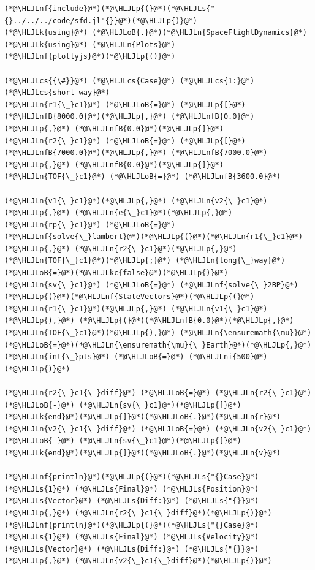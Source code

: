 \documentclass[12pt,a4paper]{article}
\newcommand{\HLJLk}[1]{\textcolor[RGB]{148,91,176}{\textbf{#1}}}
\newcommand{\HLJLkc}[1]{\textcolor[RGB]{59,151,46}{\textit{#1}}}
\newcommand{\HLJLn}[1]{#1}
\newcommand{\HLJLnf}[1]{\textcolor[RGB]{66,102,213}{#1}}
\newcommand{\HLJLs}[1]{\textcolor[RGB]{201,61,57}{#1}}
\newcommand{\HLJLnfB}[1]{\textcolor[RGB]{59,151,46}{#1}}
\newcommand{\HLJLni}[1]{\textcolor[RGB]{59,151,46}{#1}}
\newcommand{\HLJLoB}[1]{\textcolor[RGB]{102,102,102}{\textbf{#1}}}
\newcommand{\HLJLp}[1]{#1}
\newcommand{\HLJLcs}[1]{\textcolor[RGB]{153,153,119}{\textit{#1}}}
\begin{document}
\begin{lstlisting}
(*@\HLJLnf{include}@*)(*@\HLJLp{(}@*)(*@\HLJLs{"{}../../../code/sfd.jl"{}}@*)(*@\HLJLp{)}@*)
(*@\HLJLk{using}@*) (*@\HLJLoB{.}@*)(*@\HLJLn{SpaceFlightDynamics}@*)
(*@\HLJLk{using}@*) (*@\HLJLn{Plots}@*)
(*@\HLJLnf{plotlyjs}@*)(*@\HLJLp{()}@*)

(*@\HLJLcs{{\#}}@*) (*@\HLJLcs{Case}@*) (*@\HLJLcs{1:}@*) (*@\HLJLcs{short‐way}@*)
(*@\HLJLn{r1{\_}c1}@*) (*@\HLJLoB{=}@*) (*@\HLJLp{[}@*)(*@\HLJLnfB{8000.0}@*)(*@\HLJLp{,}@*) (*@\HLJLnfB{0.0}@*)(*@\HLJLp{,}@*) (*@\HLJLnfB{0.0}@*)(*@\HLJLp{]}@*)
(*@\HLJLn{r2{\_}c1}@*) (*@\HLJLoB{=}@*) (*@\HLJLp{[}@*)(*@\HLJLnfB{7000.0}@*)(*@\HLJLp{,}@*) (*@\HLJLnfB{7000.0}@*)(*@\HLJLp{,}@*) (*@\HLJLnfB{0.0}@*)(*@\HLJLp{]}@*)
(*@\HLJLn{TOF{\_}c1}@*) (*@\HLJLoB{=}@*) (*@\HLJLnfB{3600.0}@*)

(*@\HLJLn{v1{\_}c1}@*)(*@\HLJLp{,}@*) (*@\HLJLn{v2{\_}c1}@*)(*@\HLJLp{,}@*) (*@\HLJLn{e{\_}c1}@*)(*@\HLJLp{,}@*) (*@\HLJLn{rp{\_}c1}@*) (*@\HLJLoB{=}@*) (*@\HLJLnf{solve{\_}lambert}@*)(*@\HLJLp{(}@*)(*@\HLJLn{r1{\_}c1}@*)(*@\HLJLp{,}@*) (*@\HLJLn{r2{\_}c1}@*)(*@\HLJLp{,}@*) (*@\HLJLn{TOF{\_}c1}@*)(*@\HLJLp{;}@*) (*@\HLJLn{long{\_}way}@*)(*@\HLJLoB{=}@*)(*@\HLJLkc{false}@*)(*@\HLJLp{)}@*)
(*@\HLJLn{sv{\_}c1}@*) (*@\HLJLoB{=}@*) (*@\HLJLnf{solve{\_}2BP}@*)(*@\HLJLp{(}@*)(*@\HLJLnf{StateVectors}@*)(*@\HLJLp{(}@*)(*@\HLJLn{r1{\_}c1}@*)(*@\HLJLp{,}@*) (*@\HLJLn{v1{\_}c1}@*)(*@\HLJLp{),}@*) (*@\HLJLp{(}@*)(*@\HLJLnfB{0.0}@*)(*@\HLJLp{,}@*) (*@\HLJLn{TOF{\_}c1}@*)(*@\HLJLp{),}@*) (*@\HLJLn{\ensuremath{\mu}}@*)(*@\HLJLoB{=}@*)(*@\HLJLn{\ensuremath{\mu}{\_}Earth}@*)(*@\HLJLp{,}@*) (*@\HLJLn{int{\_}pts}@*) (*@\HLJLoB{=}@*) (*@\HLJLni{500}@*)(*@\HLJLp{)}@*)

(*@\HLJLn{r2{\_}c1{\_}diff}@*) (*@\HLJLoB{=}@*) (*@\HLJLn{r2{\_}c1}@*) (*@\HLJLoB{-}@*) (*@\HLJLn{sv{\_}c1}@*)(*@\HLJLp{[}@*)(*@\HLJLk{end}@*)(*@\HLJLp{]}@*)(*@\HLJLoB{.}@*)(*@\HLJLn{r}@*)
(*@\HLJLn{v2{\_}c1{\_}diff}@*) (*@\HLJLoB{=}@*) (*@\HLJLn{v2{\_}c1}@*) (*@\HLJLoB{-}@*) (*@\HLJLn{sv{\_}c1}@*)(*@\HLJLp{[}@*)(*@\HLJLk{end}@*)(*@\HLJLp{]}@*)(*@\HLJLoB{.}@*)(*@\HLJLn{v}@*)

(*@\HLJLnf{println}@*)(*@\HLJLp{(}@*)(*@\HLJLs{"{}Case}@*) (*@\HLJLs{1}@*) (*@\HLJLs{Final}@*) (*@\HLJLs{Position}@*) (*@\HLJLs{Vector}@*) (*@\HLJLs{Diff:}@*) (*@\HLJLs{"{}}@*)(*@\HLJLp{,}@*) (*@\HLJLn{r2{\_}c1{\_}diff}@*)(*@\HLJLp{)}@*)
(*@\HLJLnf{println}@*)(*@\HLJLp{(}@*)(*@\HLJLs{"{}Case}@*) (*@\HLJLs{1}@*) (*@\HLJLs{Final}@*) (*@\HLJLs{Velocity}@*) (*@\HLJLs{Vector}@*) (*@\HLJLs{Diff:}@*) (*@\HLJLs{"{}}@*)(*@\HLJLp{,}@*) (*@\HLJLn{v2{\_}c1{\_}diff}@*)(*@\HLJLp{)}@*)


\end{lstlisting}
\end{document}
